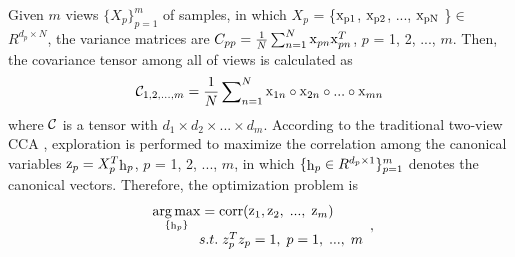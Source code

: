 \documentclass{sig-alternate-05-2015}
\begin{document}
Given $m$ views $\{X_p\}_{p=1}^m$ of samples, in which $X_p$ = \{$ \rm x_{p1}$, $ \rm x_{p2}$, ..., $\rm x_{pN}$ \}$\in$ $R^{d_p \times N}$, the variance matrices are ${C_{pp}} = \frac{1}{N}\sum\nolimits_{n = 1}^N {{{\mathop{\rm x}\nolimits} _{pn}}{\mathop{\rm x}\nolimits} _{pn}^T}$, $p$ = 1, 2, ..., $m$. Then, the covariance tensor among all of views is calculated as
\begin{equation}\label{}
{\cal C}_{1, 2, ..., m} = \frac{1}{N}\sum\nolimits_{n = 1}^N {{{\mathop{\rm x}\nolimits} _{1n}}
\circ {{\mathop{\rm x}\nolimits} _{2n}} \circ ... \circ {{\mathop{\rm x}\nolimits} _{mn}}}
\end{equation}
where $\cal C$ is a tensor with ${d_1} \times {d_2} \times ... \times {d_m}$. According to the traditional two-view CCA \cite{Hardoon2004Canonical}, exploration is performed to maximize the correlation among the canonical variables ${{\mathop{\rm z}\nolimits} _p} = X_p^T{{\mathop{\rm h}\nolimits} _p}$, $p$ = 1, 2, ..., $m$, in which $\{{{\mathop{\rm h}\nolimits} _p} \in {R^{{d_p} \times 1}}\}_{p=1}^m$ denotes the canonical vectors. Therefore, the optimization problem is
\begin{equation}\label{}
\begin{array}{l}
\mathop {\arg \max }\limits_{\{ {{\mathop{\rm h}\nolimits} _p}\} }  = {\mathop{\rm corr}\nolimits} ({{\mathop{\rm z}\nolimits} _1},{{\mathop{\rm z}\nolimits} _2},\;...,\;{{\mathop{\rm z}\nolimits} _m})\\
\;\;\;\;\;\;\;\;\;\;\;\;s.t.\;z_p^T{z_p} = 1,\;p = 1,\;...,\;m
\end{array},
\label{123}
\end{equation}
\end{document}
